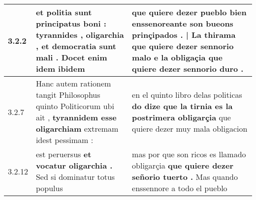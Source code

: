 \begin{tabular}{|p{1cm}|p{6.5cm}|p{6.5cm}|}

\hline
3.2.2 & et politia sunt principatus boni : \textbf{ tyrannides , oligarchia , et democratia sunt mali . } Docet enim idem ibidem & que quiere dezer pueblo bien \textbf{ enssenoreante son bueons prinçipados . | La thirama que quiere dezer sennorio malo } e la obligaçia que quiere dezer sennorio duro . \\\hline
3.2.7 & Hanc autem rationem tangit Philosophus quinto Politicorum ubi ait , \textbf{ tyrannidem esse oligarchiam } extremam idest pessimam : & en el quinto libro delas politicas \textbf{ do dize que la tirnia es la postrimera obligarçia } que quiere dezer muy mala obligacion \\\hline
3.2.12 & est peruersus \textbf{ et vocatur oligarchia . } Sed si dominatur totus populus & mas por que son ricos es llamado obligarçia \textbf{ que quiere dezer señorio tuerto . } Mas quando enssennore a todo el pueblo \\\hline

\end{tabular}
